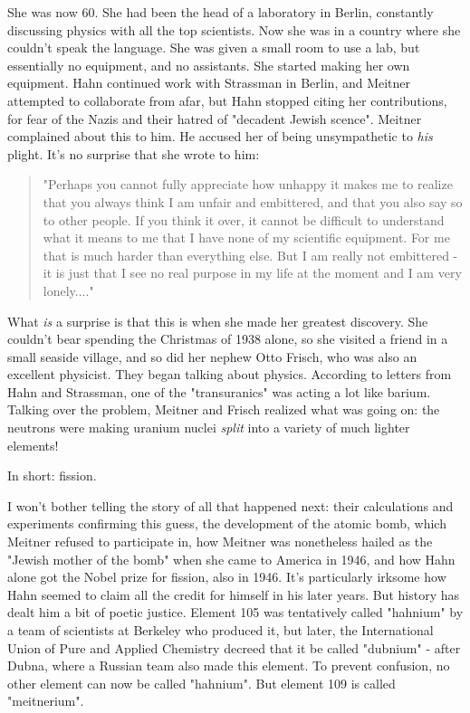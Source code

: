 She was now 60.  She had been the head of a laboratory in Berlin,
constantly discussing physics with all the top scientists.  Now she was
in a country where she couldn't speak the language.  She was given a
small room to use a lab, but essentially no equipment, and no
assistants.  She started making her own equipment.  Hahn continued work
with Strassman in Berlin, and Meitner attempted to collaborate from
afar, but Hahn stopped citing her contributions, for fear of the Nazis
and their hatred of "decadent Jewish scence".  Meitner
complained about this to him.  He accused her of being unsympathetic to
\emph{his} plight.  It's no surprise that she wrote to him:

\begin{quote}
 "Perhaps you cannot fully appreciate how unhappy it makes me to 
 realize that you always think I am unfair and embittered, and that 
 you also say so to other people.  If you think it over, it cannot 
 be difficult to understand what it means to me that I have none of 
 my scientific equipment.  For me that is much harder than everything 
 else.  But I am really not embittered - it is just that I see no real 
 purpose in my life at the moment and I am very lonely...."

\end{quote}

What \emph{is} a surprise is that this is when she made her greatest
discovery.  She couldn't bear spending the Christmas of 1938 alone, so
she visited a friend in a small seaside village, and so did her nephew
Otto Frisch, who was also an excellent physicist.  They began talking
about physics.  According to letters from Hahn and Strassman, one of the
"transuranics" was acting a lot like barium.  Talking over the
problem, Meitner and Frisch realized what was going on: the neutrons
were making uranium nuclei \emph{split} into a variety of much lighter
elements!

In short: fission.


I won't bother telling the story of all that happened next: their
calculations and experiments confirming this guess, the development of
the atomic bomb, which Meitner refused to participate in, how Meitner
was nonetheless hailed as the "Jewish mother of the bomb" when
she came to America in 1946, and how Hahn alone got the Nobel prize for
fission, also in 1946.  It's particularly irksome how Hahn seemed to
claim all the credit for himself in his later years.  But history has
dealt him a bit of poetic justice.  Element 105 was tentatively called
"hahnium" by a team of scientists at Berkeley who produced it,
but later, the International Union of Pure and Applied Chemistry decreed
that it be called "dubnium" - after Dubna, where a Russian
team also made this element.  To prevent confusion, no other element can
now be called "hahnium".  But element 109 is called
"meitnerium".

